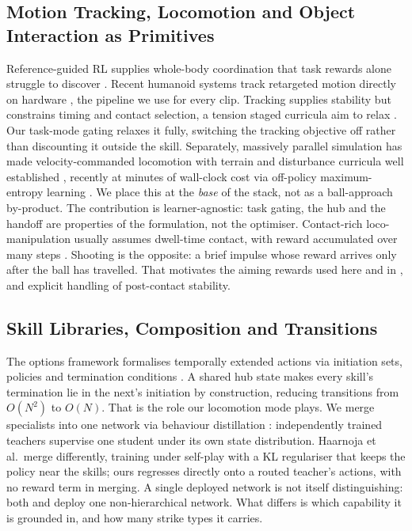 \documentclass[letterpaper, 10 pt, conference]{ieeeconf}  %
\begin{document}
\subsection{Motion Tracking, Locomotion and Object Interaction as Primitives}

Reference-guided RL supplies whole-body coordination that task rewards alone
struggle to discover \cite{deepmimic,amp}. Recent humanoid systems track
retargeted motion directly on hardware \cite{beyondmimic,gvhmr,gmr}, the
pipeline we use for every clip. Tracking supplies stability but constrains
timing and contact selection, a tension staged curricula aim to relax
\cite{robonaldo}. Our task-mode gating relaxes it fully, switching the
tracking objective off rather than discounting it outside the skill.
Separately, massively parallel simulation has made velocity-commanded
locomotion with terrain and disturbance curricula well established
\cite{isaaclab}, recently at minutes of wall-clock cost via
off-policy maximum-entropy learning \cite{sac,fastsac}. We place this at the
\emph{base} of the stack, not as a ball-approach by-product. The contribution is learner-agnostic: task
gating, the hub and the handoff are properties of the formulation, not the
optimiser. Contact-rich loco-manipulation usually assumes dwell-time contact, with
reward accumulated over many steps \cite{falcon}. Shooting is the opposite: a
brief impulse whose reward arrives only after the ball has travelled. That
motivates the aiming rewards used here and in \cite{robonaldo}, and explicit
handling of post-contact stability.
\subsection{Skill Libraries, Composition and Transitions}

The options framework formalises temporally extended actions via initiation
sets, policies and termination conditions \cite{options}. A shared hub state
makes every skill's termination lie in the next's initiation by construction,
reducing transitions from $O(N^2)$ to $O(N)$. That is the role our locomotion
mode plays. We merge specialists into one network via behaviour distillation
\cite{dagger,policydistillation}: independently trained teachers supervise one
student under its own state distribution. Haarnoja et al.\ merge differently, training under self-play with a KL
regulariser that keeps the policy near the skills; ours regresses directly
onto a routed teacher's actions, with no reward term in merging. A single
deployed network is not itself distinguishing: both
\cite{haarnoja2024soccer} and \cite{robonaldo} deploy one non-hierarchical
network. What differs is which capability it is grounded in, and how many
strike types it carries.
\end{document}
